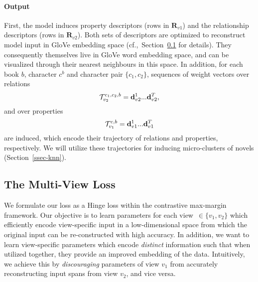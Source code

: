 \documentclass[11pt,letterpaper]{article}
\begin{document}
\paragraph{Output} First, the model induces property descriptors (rows in $\mathbf{R}_{v1}$) and the  relationship descriptors (rows in $\mathbf{R}_{v2}$). Both sets of descriptors are optimized to reconstruct model input in GloVe embedding space (cf.,~Section~\ref{ssec-mvplot-loss} for details). They consequently themselves live in GloVe word embedding space, and can be visualized through their nearest neighbours in this space. In addition, for each book $b$, character $c^b$ and character pair $\{c_1,c_2\}$, sequences of weight vectors over relations 
\begin{equation*}
\small
\mathbf{\mathcal{T}}_{v_2}^{c_1,c_2,b} =\mathbf{d}_{v2}^1...\mathbf{d}_{v2}^T,
\end{equation*}
and over properties 
\begin{equation*}                                                                                                                                                                                                                                                                                                                                                                                         
\small
\mathbf{\mathcal{T}}_{v_1}^{c,b} =\mathbf{d}_{v1}^1...\mathbf{d}_{v1}^T
\end{equation*} 
are induced, which encode their trajectory of relations and properties, respectively. We will utilize these trajectories for inducing micro-clusters of novels (Section~\ref{ssec-knn}).

\subsection{The Multi-View Loss}
\label{ssec-mvplot-loss}
We formulate our loss as a Hinge loss within the contrastive max-margin framework. Our objective is to learn parameters for each view~\mbox{$\in \{v_1,v_2\}$} which efficiently encode view-specific input in a low-dimensional space from which the original input can be re-constructed with high accuracy. In addition, we want to learn view-specific parameters which encode {\it distinct} information such that when utilized together, they provide an improved embedding of the data. Intuitively, we achieve this by {\it discouraging} parameters of view $v_1$ from accurately reconstructing input spans from view $v_2$, and vice versa. 
\end{document}
